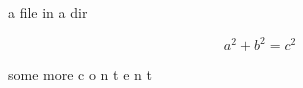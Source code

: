 \documentclass{article}
\begin{document}
a file in a dir

\[
    a^2 + b^2 = c^2
\]

some more c o n t e n t
\end{document}

